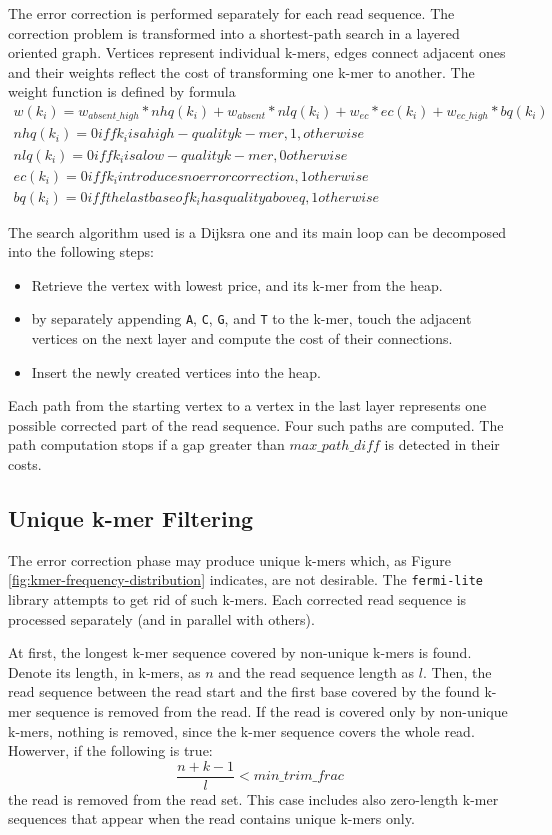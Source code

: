 The error correction is performed separately for each read sequence. The correction problem is transformed into a shortest-path search in a layered oriented graph. Vertices represent individual k-mers, edges connect adjacent ones and their weights reflect the cost of transforming one k-mer to another. The weight function is defined by formula
\begin{gather}
	w(k_i) = w_{absent\_high}*nhq(k_i) + w_{absent}*nlq(k_i) + w_{ec}*ec(k_i) + w_{ec\_high}*bq(k_i) \\
	nhq(k_i) = 0 iff k_i is a high-quality k-mer, 1, otherwise \\
	nlq(k_i) = 0 iff k_i is a low-quality k-mer, 0 otherwise \\
	ec(k_i) = 0 iff k_i introduces no error correction, 1 otherwise \\
	bq(k_i) = 0 iff the last base of k_i has quality above q, 1 otherwise
\end{gather}

The search algorithm used is a Dijksra one and its main loop can be decomposed into the following steps:
\begin{itemize}
\item Retrieve the vertex with lowest price, and its k-mer from the heap.
\item by separately appending \texttt{A}, \texttt{C}, \texttt{G}, and \texttt{T} to the k-mer, touch the adjacent vertices on the next layer and compute the cost of their connections.
\item Insert the newly created vertices into the heap.
\end{itemize}

Each path from the starting vertex to a vertex in the last layer represents one possible corrected part of the read sequence. Four such paths are computed. The path computation stops if a gap greater than $max\_path\_diff$ is detected in their costs.

\subsection{Unique k-mer Filtering}
\label{subsec:fermi-unique-kmer-filtering}

The error correction phase may produce unique k-mers which, as Figure \ref{fig:kmer-frequency-distribution} indicates, are not desirable. The \texttt{fermi-lite} library attempts to get rid of such k-mers. Each corrected read sequence is processed separately (and in parallel with others). 

At first, the longest k-mer sequence covered by non-unique k-mers is found. Denote its length, in k-mers, as $n$ and the read sequence length as $l$. Then, the read sequence between the read start and the first base covered by the found k-mer sequence is removed from the read. If the read is covered only by non-unique k-mers, nothing is removed, since the k-mer sequence covers the whole read. Howerver, if the following is true:
$$
\frac{n + k - 1}{l} < min\_trim\_frac
$$
the read is removed from the read set. This case includes also zero-length k-mer sequences that appear when the read contains unique k-mers only.